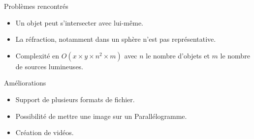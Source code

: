 \documentclass{beamer}
\begin{document}
  \begin{frame}{Problèmes rencontrés}
    \begin{itemize}
      \item Un objet peut s'intersecter avec lui-même.
      \item La réfraction, notamment dans un sphère n'est pas représentative.
      \item Complexité en $O(x\times y\times n^2 \times m)$ avec $n$ le nombre
        d'objets et $m$ le nombre de sources lumineuses.
    \end{itemize}
  \end{frame}

  \begin{frame}{Améliorations}
    \begin{itemize}
      \item Support de plusieurs formats de fichier.
      \item Possibilité de mettre une image sur un Parallélogramme.
      \item Création de vidéos.
    \end{itemize}
  \end{frame}
\end{document}
